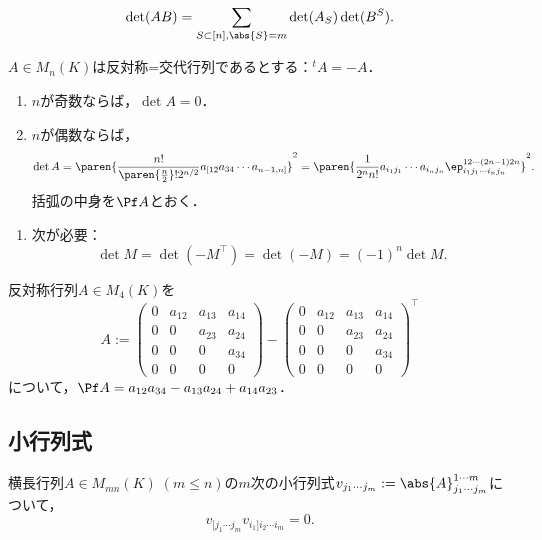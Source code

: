 \documentclass[uplatex, dvipdfmx]{jsreport}
\begin{document}
\begin{proposition}
    \[\det(AB)=\sum_{S\subset[n],\abs{S}=m}\det(A_S)\det(B^S).\]
\end{proposition}

\begin{proposition}[Pfaffian]
    $A\in M_n(K)$は反対称=交代行列であるとする：${}^t\!A=-A$．
    \begin{enumerate}
        \item $n$が奇数ならば，$\det A=0$．
        \item $n$が偶数ならば，
        \[\det A=\paren{\frac{n!}{\paren{\frac{n}{2}}!2^{n/2}}a_{[12}a_{34}\cdots a_{n-1,n]}}^2=\paren{\frac{1}{2^nn!}a_{i_1j_1}\cdots a_{i_nj_n}\ep^{12\cdots (2n-1)2n}_{i_1j_1\cdots i_nj_n}}^2.\]
        括弧の中身を$\Pf A$とおく．
    \end{enumerate}
\end{proposition}
\begin{Proof}\mbox{}
    \begin{enumerate}
        \item 次が必要：
        \[\det M=\det(-M^\top)=\det(-M)=(-1)^n\det M.\]
    \end{enumerate}
\end{Proof}
\begin{example}
    反対称行列$A\in M_4(K)$を
    \[A:=\begin{pmatrix}0&a_{12}&a_{13}&a_{14}\\0&0&a_{23}&a_{24}\\0&0&0&a_{34}\\0&0&0&0\end{pmatrix}-\begin{pmatrix}0&a_{12}&a_{13}&a_{14}\\0&0&a_{23}&a_{24}\\0&0&0&a_{34}\\0&0&0&0\end{pmatrix}^\top\]
    について，$\Pf A=a_{12}a_{34}-a_{13}a_{24}+a_{14}a_{23}$．
\end{example}

\subsection{小行列式}

\begin{proposition}
    横長行列$A\in M_{mn}(K)\;(m\le n)$の$m$次の小行列式$v_{j_1\cdots j_m}:=\abs{A}^{1\cdots m}_{j_1\cdots j_m}$について，
    \[v_{[j_1\cdots j_m}v_{i_1]i_2\cdots i_m}=0.\]
\end{proposition}
\end{document}
